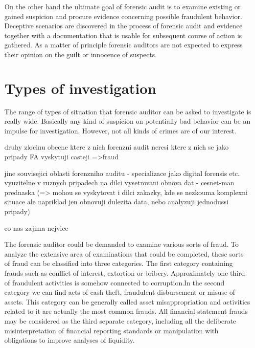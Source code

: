 On the other hand the ultimate goal of forensic audit is to examine existing or gained suspicion and procure evidence concerning possible fraudulent behavior. Deceptive scenarios are discovered in the process of forensic audit and evidence together with a documentation that is usable for subsequent course of action is gathered. As a matter of principle forensic auditors are not expected to express their opinion on the guilt or innocence of suspects.



\section{Types of investigation}

The range of types of situation that forensic auditor can be asked to investigate is really wide. Basically any kind of suspicion on potentially bad behavior can be an impulse for investigation. However, not all kinds of crimes are of our interest. 


druhy zlocinu obecne
ktere z nich forenzni audit neresi
ktere z nich se jako pripady FA vyskytuji casteji
=>fraud

jine souvisejici oblasti forenzniho auditu
- specializace jako digital forensis etc.
vyuzitelne v ruznych pripadech na dilci vysetrovani
obnova dat - cesnet-man prednaska
(=> mohou se vyskytovat i dilci zakazky, kde se nezkouma komplexni situace ale napriklad jen obnovuji dulezita data, nebo analyzuji jednodussi pripady)


co nas zajima nejvice










The forensic auditor could be demanded to examine various sorts of fraud. To analyze the extensive area of examinations that could be completed, these sorts of fraud can be classified into three categories. The first category containing frauds such as conflict of interest, extortion or bribery. Approximately one third of fraudulent activities is somehow connected to corruption.In the second category we can find acts of cash theft, fraudulent disbursement or misuse of assets. This category can be generally called asset misappropriation and activities related to it are actually the most common frauds. All financial statement frauds may be considered as the third separate category, including all the deliberate misinterpretation of financial reporting standards or manipulation with obligations to improve analyses of liquidity. 




